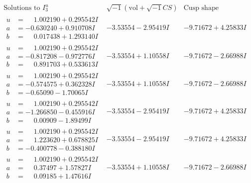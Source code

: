\documentclass[1p]{elsarticle_modified}
\theoremstyle{definition}
\newcommand{\I}{\sqrt{-1}}
\begin{document}
$$\begin{array}{c|c|c}  
\text{Solutions to }I^u_{3}& \I (\text{vol} + \sqrt{-1}CS) & \text{Cusp shape}\\
 \hline 
\begin{aligned}
u &= \phantom{-}1.002190 + 0.295542 I \\
a &= -0.630240 + 0.910708 I \\
b &= \phantom{-}0.017438 + 1.293140 I\end{aligned}
 & -3.53554 - 2.95419 I & -9.71672 + 4.25833 I \\ \hline\begin{aligned}
u &= \phantom{-}1.002190 + 0.295542 I \\
a &= -0.817208 - 0.972776 I \\
b &= \phantom{-}0.891703 + 0.533613 I\end{aligned}
 & -3.53554 + 1.10558 I & -9.71672 - 2.66988 I \\ \hline\begin{aligned}
u &= \phantom{-}1.002190 + 0.295542 I \\
a &= -0.574575 + 0.362328 I \\
b &= -0.65090 - 1.70065 I\end{aligned}
 & -3.53554 + 1.10558 I & -9.71672 - 2.66988 I \\ \hline\begin{aligned}
u &= \phantom{-}1.002190 + 0.295542 I \\
a &= -1.266850 - 0.455916 I \\
b &= \phantom{-}0.00909 - 1.89499 I\end{aligned}
 & -3.53554 - 2.95419 I & -9.71672 + 4.25833 I \\ \hline\begin{aligned}
u &= \phantom{-}1.002190 + 0.295542 I \\
a &= \phantom{-}1.223620 + 0.678825 I \\
b &= -0.400778 - 0.388180 I\end{aligned}
 & -3.53554 - 2.95419 I & -9.71672 + 4.25833 I \\ \hline\begin{aligned}
u &= \phantom{-}1.002190 + 0.295542 I \\
a &= \phantom{-}0.37497 + 1.57827 I \\
b &= \phantom{-}0.09185 + 1.47616 I\end{aligned}
 & -3.53554 + 1.10558 I & -9.71672 - 2.66988 I \\ \hline\begin{aligned}

\end{aligned}
\end{array}$$
\end{document}
